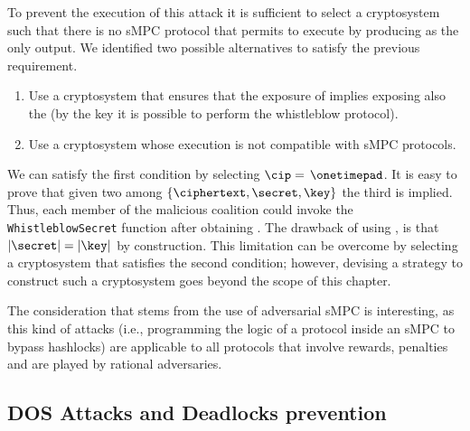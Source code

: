To prevent the execution of this attack it is sufficient to select a cryptosystem \cipvocabulary such that there is no sMPC protocol that permits to execute \dec by producing \secret as the only output.
We identified two possible alternatives to satisfy the previous requirement.

\begin{enumerate}
	\item Use a cryptosystem that ensures that the exposure of \secret implies exposing also the \key (by the key it is possible to perform the whistleblow protocol).
	\item Use a cryptosystem whose execution is not compatible with sMPC protocols.
\end{enumerate}

We can satisfy the first condition by selecting $ \mathcal{\cip}=$$ \text{ }\onetimepad$. 
It is easy to prove that given two among $\{ \ciphertext , \secret , \key \}$ the third is implied. 
Thus, each member of the malicious coalition could invoke the \texttt{WhistleblowSecret} function after obtaining \secret. 
The drawback of using \onetimepad, is that $|\secret| = |\key|$ by construction. 
This limitation can be overcome by selecting a cryptosystem that satisfies the second condition; however, devising a strategy to construct such a cryptosystem goes beyond the scope of this chapter.

The consideration that stems from the use of adversarial sMPC is interesting, as this kind of attacks (i.e., programming the logic of a protocol inside an sMPC to bypass hashlocks) are applicable to all protocols that involve rewards, penalties and are played by rational adversaries.

\subsection{DOS Attacks and Deadlocks prevention}

